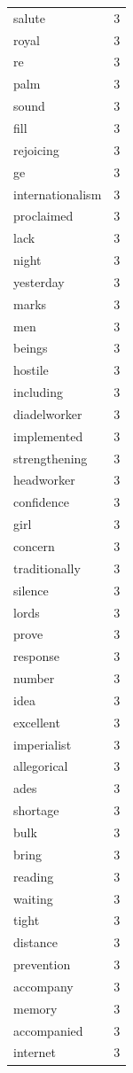 \begin{tabular}{lr}
salute & 3 \\
royal & 3 \\
re & 3 \\
palm & 3 \\
sound & 3 \\
fill & 3 \\
rejoicing & 3 \\
ge & 3 \\
internationalism & 3 \\
proclaimed & 3 \\
lack & 3 \\
night & 3 \\
yesterday & 3 \\
marks & 3 \\
men & 3 \\
beings & 3 \\
hostile & 3 \\
including & 3 \\
diadelworker & 3 \\
implemented & 3 \\
strengthening & 3 \\
headworker & 3 \\
confidence & 3 \\
girl & 3 \\
concern & 3 \\
traditionally & 3 \\
silence & 3 \\
lords & 3 \\
prove & 3 \\
response & 3 \\
number & 3 \\
idea & 3 \\
excellent & 3 \\
imperialist & 3 \\
allegorical & 3 \\
ades & 3 \\
shortage & 3 \\
bulk & 3 \\
bring & 3 \\
reading & 3 \\
waiting & 3 \\
tight & 3 \\
distance & 3 \\
prevention & 3 \\
accompany & 3 \\
memory & 3 \\
accompanied & 3 \\
internet & 3 \\

\end{tabular}
